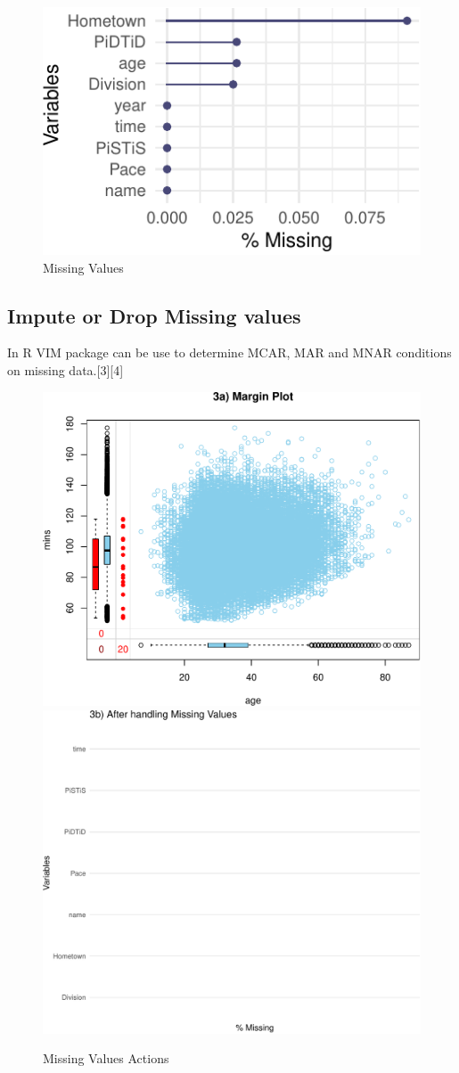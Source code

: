 \documentclass[
]{article}
\begin{document}
\begin{figure}[H]

{\centering \includegraphics{case_study02_files/figure-latex/unnamed-chunk-6-1} 

}

\caption{Missing Values}\label{fig:unnamed-chunk-6}
\end{figure}

\hypertarget{impute-or-drop-missing-values}{%
\subsection{Impute or Drop Missing
values}\label{impute-or-drop-missing-values}}

In R VIM package can be use to determine MCAR, MAR and MNAR conditions
on missing data.{[}3{]}{[}4{]}

\begin{figure}[H]

\includegraphics[width=.49\linewidth,]{case_study02_files/figure-latex/unnamed-chunk-7-1} \includegraphics[width=.49\linewidth,]{case_study02_files/figure-latex/unnamed-chunk-7-2} \hfill{}

\caption{Missing Values Actions}\label{fig:unnamed-chunk-7}
\end{figure}
\end{document}
